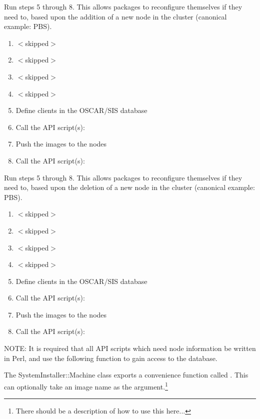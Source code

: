 
Run steps 5 through 8.  This allows packages to reconfigure themselves
if they need to, based upon the addition of a new node in the cluster
(canonical example: PBS).

\begin{enumerate}
\item $<$skipped$>$
\item $<$skipped$>$
\item $<$skipped$>$
\item $<$skipped$>$
\item Define clients in the OSCAR/SIS database
\item Call the API script(s): 
\item Push the images to the nodes
\item Call the API script(s): 
\end{enumerate}



Run steps 5 through 8.  This allows packages to reconfigure themselves
if they need to, based upon the deletion of a new node in the cluster
(canonical example: PBS).

\begin{enumerate}
\item $<$skipped$>$
\item $<$skipped$>$
\item $<$skipped$>$
\item $<$skipped$>$
\item Define clients in the OSCAR/SIS database
\item Call the API script(s): 
\item Push the images to the nodes
\item Call the API script(s): 
\end{enumerate}



NOTE: It is required that all API scripts which need node information be
written in Perl, and use the following function to gain access to the
database.

The SystemInstaller::Machine class exports a convenience function
called .  This can optionally take an image
name as the argument.\footnote{There should be a description of how to
  use this here...}

